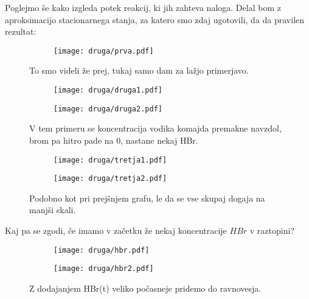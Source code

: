 \documentclass{article}
\begin{document}
Poglejmo še kako izgleda potek reakcij, ki jih zahteva naloga. Delal bom z aproksimacijo stacionarnega stanja, za katero smo zdaj ugotovili, da da pravilen rezultat:

\begin{figure}[H]
\centering
\begin{subfigure}{\textwidth}
\texttt{[image: druga/prva.pdf]}
\end{subfigure}
\caption*{To smo videli že prej, tukaj samo dam za lažjo primerjavo.}
\end{figure}
\begin{figure}[H]
\centering
\begin{subfigure}{.49\textwidth}
\texttt{[image: druga/druga1.pdf]}
\end{subfigure}
\begin{subfigure}{.49\textwidth}
\texttt{[image: druga/druga2.pdf]}
\end{subfigure}
\caption*{V tem primeru se koncentracija vodika komajda premakne navzdol, brom pa hitro pade na 0, nastane nekaj HBr.}
\end{figure}

\begin{figure}[H]
\centering
\begin{subfigure}{.49\textwidth}
\texttt{[image: druga/tretja1.pdf]}
\end{subfigure}
\begin{subfigure}{.49\textwidth}
\texttt{[image: druga/tretja2.pdf]}
\end{subfigure}
\caption*{Podobno kot pri prejšnjem grafu, le da se vse skupaj dogaja na manjši skali.}
\end{figure}

Kaj pa se zgodi, če imamo v začetku že nekaj koncentracije $HBr$ v raztopini?
\begin{figure}[H]
\begin{subfigure}{.49\textwidth}
\texttt{[image: druga/hbr.pdf]}
\end{subfigure}
\begin{subfigure}{.49\textwidth}
\texttt{[image: druga/hbr2.pdf]}
\end{subfigure}
\caption*{Z dodajanjem HBr(t) veliko počasneje pridemo do ravnovesja.}
\end{figure}
\end{document}
